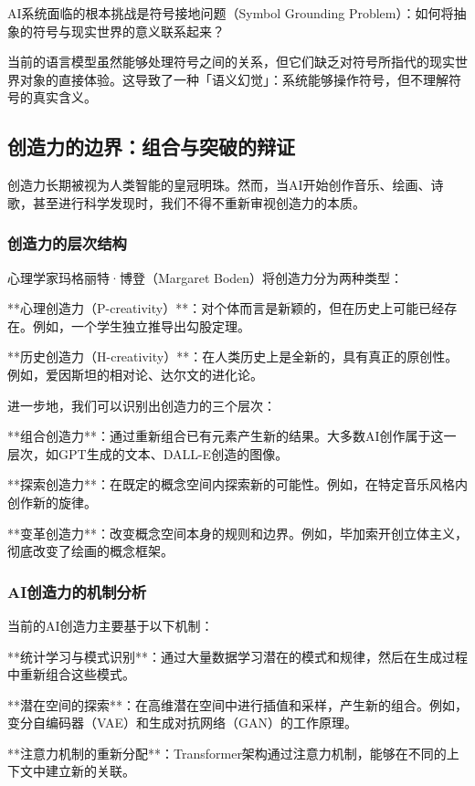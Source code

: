AI系统面临的根本挑战是符号接地问题（Symbol Grounding Problem）：如何将抽象的符号与现实世界的意义联系起来？

当前的语言模型虽然能够处理符号之间的关系，但它们缺乏对符号所指代的现实世界对象的直接体验。这导致了一种「语义幻觉」：系统能够操作符号，但不理解符号的真实含义。

\subsection{创造力的边界：组合与突破的辩证}

创造力长期被视为人类智能的皇冠明珠。然而，当AI开始创作音乐、绘画、诗歌，甚至进行科学发现时，我们不得不重新审视创造力的本质。

\subsubsection{创造力的层次结构}

心理学家玛格丽特·博登（Margaret Boden）将创造力分为两种类型：

**心理创造力（P-creativity）**：对个体而言是新颖的，但在历史上可能已经存在。例如，一个学生独立推导出勾股定理。

**历史创造力（H-creativity）**：在人类历史上是全新的，具有真正的原创性。例如，爱因斯坦的相对论、达尔文的进化论。

进一步地，我们可以识别出创造力的三个层次：

**组合创造力**：通过重新组合已有元素产生新的结果。大多数AI创作属于这一层次，如GPT生成的文本、DALL-E创造的图像。

**探索创造力**：在既定的概念空间内探索新的可能性。例如，在特定音乐风格内创作新的旋律。

**变革创造力**：改变概念空间本身的规则和边界。例如，毕加索开创立体主义，彻底改变了绘画的概念框架。

\subsubsection{AI创造力的机制分析}

当前的AI创造力主要基于以下机制：

**统计学习与模式识别**：通过大量数据学习潜在的模式和规律，然后在生成过程中重新组合这些模式。

**潜在空间的探索**：在高维潜在空间中进行插值和采样，产生新的组合。例如，变分自编码器（VAE）和生成对抗网络（GAN）的工作原理。

**注意力机制的重新分配**：Transformer架构通过注意力机制，能够在不同的上下文中建立新的关联。

